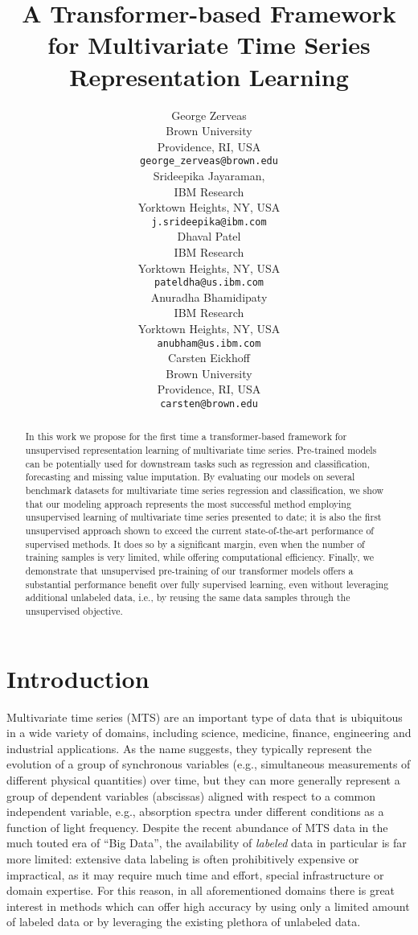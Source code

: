 \documentclass{article} \usepackage{iclr2021_conference,times}
\title{A Transformer-based Framework for Multivariate Time Series Representation Learning}
\author{George Zerveas\\
Brown University\\
Providence, RI, USA \\
\texttt{george\_zerveas@brown.edu}\\

\And
Srideepika Jayaraman, \\
IBM Research\\
Yorktown Heights, NY, USA \\
\texttt{j.srideepika@ibm.com}\\

\And
Dhaval Patel \\
IBM Research \\
Yorktown Heights, NY, USA \\
\texttt{pateldha@us.ibm.com}\\

\And
Anuradha Bhamidipaty \\
IBM Research \\
Yorktown Heights, NY, USA \\
\texttt{anubham@us.ibm.com}\\

\And
Carsten Eickhoff \\
Brown University\\
Providence, RI, USA \\
\texttt{carsten@brown.edu}\\
}
\begin{document}
\maketitle

\begin{abstract}
In this work we propose for the first time a transformer-based framework for unsupervised representation learning of multivariate time series. Pre-trained models can be potentially used for downstream tasks such as regression and classification, forecasting and missing value imputation. By evaluating our models on several benchmark datasets for multivariate time series regression and classification, we show that our modeling approach represents the most successful method  employing unsupervised learning of multivariate time series presented to date; it is also the first unsupervised approach shown to exceed the current state-of-the-art performance of supervised methods. It does so by a significant margin, even when the number of training samples is very limited, while offering computational efficiency. Finally, we demonstrate that unsupervised pre-training of our transformer models offers a substantial performance benefit over fully supervised learning, even without leveraging additional unlabeled data, i.e., by reusing the same data samples through the unsupervised objective.
\end{abstract}

\section{Introduction}

Multivariate time series (MTS) are an important type of data that is ubiquitous in a wide variety of domains, including science, medicine, finance, engineering and industrial applications.
As the name suggests, they typically represent the evolution of a group of synchronous variables (e.g., simultaneous measurements of different physical quantities) over time, but they can more generally represent a group of dependent variables (abscissas) aligned with respect to a common independent variable, e.g., absorption spectra under different conditions as a function of light frequency. Despite the recent abundance of MTS data in the much touted era of ``Big Data'', the availability of \textit{labeled} data in particular is far more limited: extensive data labeling is often prohibitively expensive or impractical, as it may require much time and effort, special infrastructure or domain expertise. For this reason, in all aforementioned domains there is great interest in methods which can offer high accuracy by using only a limited amount of labeled data or by leveraging the existing plethora of unlabeled data.
\end{document}
